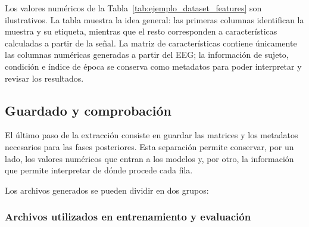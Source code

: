 \begin{table}[H]
\centering
\small
\caption{Ejemplo simplificado de la estructura del conjunto de características.}
\label{tab:ejemplo_dataset_features}
\end{table}

Los valores numéricos de la Tabla~\ref{tab:ejemplo_dataset_features} son ilustrativos. La tabla muestra la idea general: las primeras columnas identifican la muestra y su etiqueta, mientras que el resto corresponden a características calculadas a partir de la señal. La matriz de características contiene únicamente las columnas numéricas generadas a partir del \ac{EEG}; la información de sujeto, condición e índice de época se conserva como metadatos para poder interpretar y revisar los resultados.

\subsection{Guardado y comprobación}

El último paso de la extracción consiste en guardar las matrices y los metadatos necesarios para las fases posteriores. Esta separación permite conservar, por un lado, los valores numéricos que entran a los modelos y, por otro, la información que permite interpretar de dónde procede cada fila.

Los archivos generados se pueden dividir en dos grupos:

\subsubsection{Archivos utilizados en entrenamiento y evaluación}

